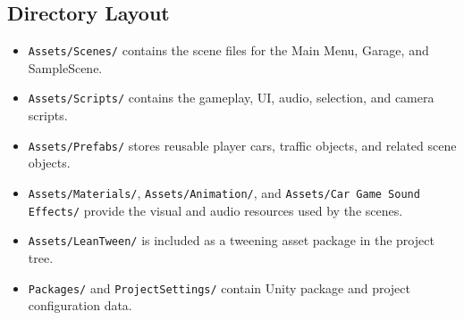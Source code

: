 \documentclass[12pt,a4paper]{article}
\begin{document}
\subsection{Directory Layout}
\begin{itemize}
    \item \texttt{Assets/Scenes/} contains the scene files for the Main Menu, Garage, and SampleScene.
    \item \texttt{Assets/Scripts/} contains the gameplay, UI, audio, selection, and camera scripts.
    \item \texttt{Assets/Prefabs/} stores reusable player cars, traffic objects, and related scene objects.
    \item \texttt{Assets/Materials/}, \texttt{Assets/Animation/}, and \texttt{Assets/Car Game Sound Effects/} provide the visual and audio resources used by the scenes.
    \item \texttt{Assets/LeanTween/} is included as a tweening asset package in the project tree.
    \item \texttt{Packages/} and \texttt{ProjectSettings/} contain Unity package and project configuration data.
\end{itemize}
\end{document}

